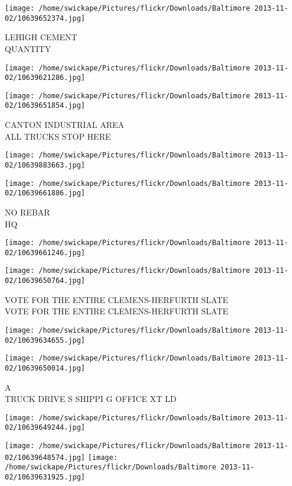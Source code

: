 \documentclass[10pt,letterpaper]{article}
\begin{document}
\vspace{0.25in}
\texttt{[image: /home/swickape/Pictures/flickr/Downloads/Baltimore 2013-11-02/10639652374.jpg]}

LEHIGH CEMENT\\
QUANTITY
\pagebreak

\texttt{[image: /home/swickape/Pictures/flickr/Downloads/Baltimore 2013-11-02/10639621286.jpg]}

\vspace{0.25in}
\texttt{[image: /home/swickape/Pictures/flickr/Downloads/Baltimore 2013-11-02/10639651854.jpg]}

CANTON INDUSTRIAL AREA\\
ALL TRUCKS STOP HERE
\pagebreak

\texttt{[image: /home/swickape/Pictures/flickr/Downloads/Baltimore 2013-11-02/10639883663.jpg]}

\vspace{0.25in}
\texttt{[image: /home/swickape/Pictures/flickr/Downloads/Baltimore 2013-11-02/10639661886.jpg]}

NO REBAR\\
HQ
\pagebreak

\texttt{[image: /home/swickape/Pictures/flickr/Downloads/Baltimore 2013-11-02/10639661246.jpg]}

\vspace{0.25in}
\texttt{[image: /home/swickape/Pictures/flickr/Downloads/Baltimore 2013-11-02/10639650764.jpg]}

VOTE FOR THE ENTIRE CLEMENS{-}HERFURTH SLATE\\
VOTE FOR THE ENTIRE CLEMENS{-}HERFURTH SLATE
\pagebreak

\texttt{[image: /home/swickape/Pictures/flickr/Downloads/Baltimore 2013-11-02/10639634655.jpg]}

\vspace{0.25in}
\texttt{[image: /home/swickape/Pictures/flickr/Downloads/Baltimore 2013-11-02/10639650014.jpg]}

A\\
TRUCK DRIVE S SHIPPI G OFFICE XT LD
\pagebreak

\texttt{[image: /home/swickape/Pictures/flickr/Downloads/Baltimore 2013-11-02/10639649244.jpg]}

\vspace{0.25in}
\texttt{[image: /home/swickape/Pictures/flickr/Downloads/Baltimore 2013-11-02/10639648574.jpg]}
\texttt{[image: /home/swickape/Pictures/flickr/Downloads/Baltimore 2013-11-02/10639631925.jpg]}
\end{document}

